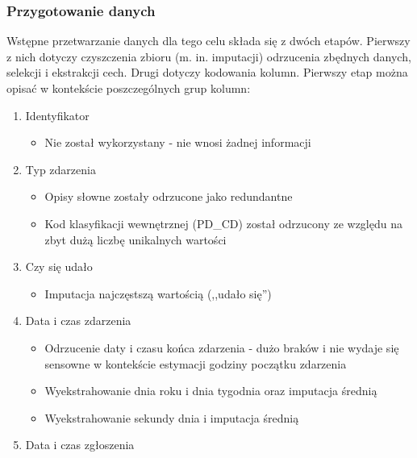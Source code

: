 \documentclass{classrep}
\begin{document}
{{            \subsubsection{Przygotowanie danych} {
                Wstępne przetwarzanie danych dla tego celu składa się z dwóch etapów. Pierwszy z nich dotyczy czyszczenia zbioru (m. in. imputacji) odrzucenia zbędnych danych, selekcji i ekstrakcji cech. Drugi dotyczy kodowania kolumn. Pierwszy etap można opisać w kontekście poszczególnych grup kolumn:
                \begin{enumerate}
                    \item Identyfikator
                    \begin{itemize}
                        \item Nie został wykorzystany - nie wnosi żadnej informacji
                    \end{itemize}
                    \item Typ zdarzenia
                    \begin{itemize}
                        \item Opisy słowne zostały odrzucone jako redundantne
                        \item Kod klasyfikacji wewnętrznej (PD\_CD) został odrzucony ze względu na zbyt dużą liczbę unikalnych wartości
                    \end{itemize}
                    \item Czy się udało
                    \begin{itemize}
                        \item Imputacja najczęstszą wartością (,,udało się'')
                    \end{itemize}
                    \item Data i czas zdarzenia
                    \begin{itemize}
                        \item Odrzucenie daty i czasu końca zdarzenia - dużo braków i nie wydaje się sensowne w kontekście estymacji godziny początku zdarzenia
                        \item Wyekstrahowanie dnia roku i dnia tygodnia oraz imputacja średnią
                        \item Wyekstrahowanie sekundy dnia i imputacja średnią
                    \end{itemize}
                    \item Data i czas zgłoszenia
                    \begin{itemize}

\end{itemize}
\end{enumerate}}}}
\end{document}
